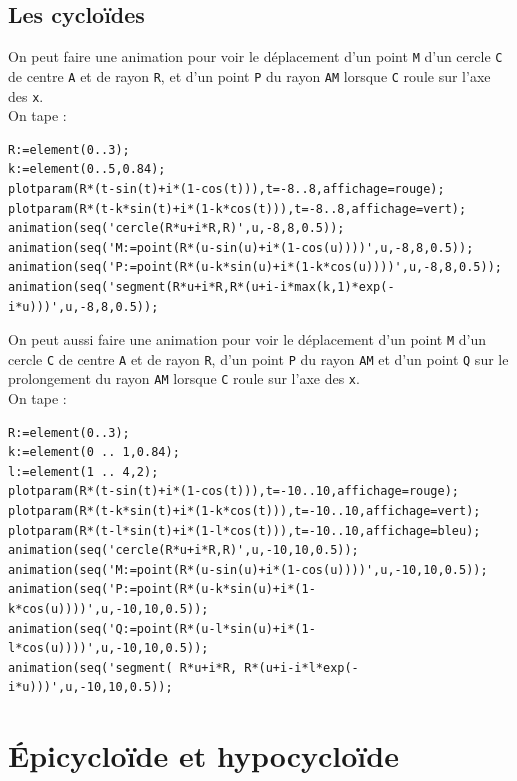 \documentclass[a4paper,11pt]{book}
\begin{document}
\subsection{Les cyclo\"ides}
On peut faire une animation pour voir le d\'eplacement d'un point {\tt M} d'un 
cercle {\tt C} de centre {\tt A} et de rayon {\tt R}, et d'un point 
{\tt P} du rayon {\tt AM}  lorsque {\tt C} roule sur l'axe des {\tt x}.\\
On tape :
\begin{verbatim}
R:=element(0..3);
k:=element(0..5,0.84);
plotparam(R*(t-sin(t)+i*(1-cos(t))),t=-8..8,affichage=rouge);
plotparam(R*(t-k*sin(t)+i*(1-k*cos(t))),t=-8..8,affichage=vert);
animation(seq('cercle(R*u+i*R,R)',u,-8,8,0.5));
animation(seq('M:=point(R*(u-sin(u)+i*(1-cos(u))))',u,-8,8,0.5));
animation(seq('P:=point(R*(u-k*sin(u)+i*(1-k*cos(u))))',u,-8,8,0.5));
animation(seq('segment(R*u+i*R,R*(u+i-i*max(k,1)*exp(-i*u)))',u,-8,8,0.5));
\end{verbatim}
On peut aussi faire une animation pour voir le d\'eplacement d'un point {\tt M}
d'un cercle {\tt C} de centre {\tt A} et de rayon {\tt R}, d'un point 
{\tt P} du rayon {\tt AM} et d'un point {\tt Q} sur le 
prolongement du rayon {\tt AM} lorsque {\tt C} roule sur l'axe des {\tt x}.\\ 
On tape :
\begin{verbatim}
R:=element(0..3);
k:=element(0 .. 1,0.84);
l:=element(1 .. 4,2);
plotparam(R*(t-sin(t)+i*(1-cos(t))),t=-10..10,affichage=rouge);
plotparam(R*(t-k*sin(t)+i*(1-k*cos(t))),t=-10..10,affichage=vert);
plotparam(R*(t-l*sin(t)+i*(1-l*cos(t))),t=-10..10,affichage=bleu);
animation(seq('cercle(R*u+i*R,R)',u,-10,10,0.5));
animation(seq('M:=point(R*(u-sin(u)+i*(1-cos(u))))',u,-10,10,0.5));
animation(seq('P:=point(R*(u-k*sin(u)+i*(1-k*cos(u))))',u,-10,10,0.5));
animation(seq('Q:=point(R*(u-l*sin(u)+i*(1-l*cos(u))))',u,-10,10,0.5));
animation(seq('segment( R*u+i*R, R*(u+i-i*l*exp(-i*u)))',u,-10,10,0.5));
\end{verbatim}

\section{\'Epicyclo\"ide et hypocyclo\"ide}
\end{document}
